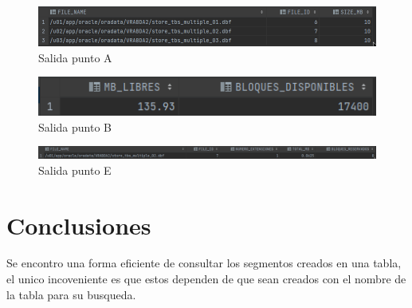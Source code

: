 \documentclass[journal]{IEEEtran}
\begin{document}
\begin{figure}[H]
  \centering
  \includegraphics[scale=.25]{captura_a.png}
   \caption{Salida punto A}
   \label{fig:validador_1}
\end{figure}
\begin{figure}[H]
  \centering
  \includegraphics[scale=.50]{captura_b.png}
   \caption{Salida punto B}
   \label{fig:validador_2}
\end{figure}
\begin{figure}[H]
  \centering
  \includegraphics[scale=.50]{captura_1.png}
   \caption{Salida punto E}
   \label{fig:validador_2}
\end{figure}

\section{Conclusiones}
Se encontro una forma eficiente de consultar los segmentos creados en una tabla, 
el unico incoveniente es que estos dependen de que sean creados con el nombre de la tabla 
para su busqueda.
\ifCLASSOPTIONcaptionsoff
  \newpage

\fi
\end{document}
